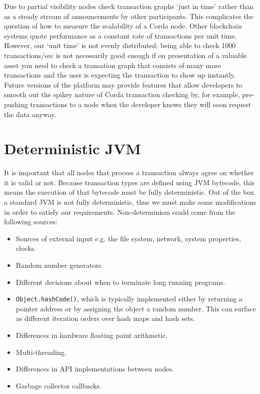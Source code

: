 \documentclass{article}
\begin{document}

Due to partial visibility nodes check transaction graphs `just in time' rather than as a steady stream of
announcements by other participants. This complicates the question of how to measure the scalability of a Corda
node. Other blockchain systems quote performance as a constant rate of transactions per unit time.
However, our `unit time' is not evenly distributed: being able to check 1000 transactions/sec is not
necessarily good enough if on presentation of a valuable asset you need to check a transation graph that consists
of many more transactions and the user is expecting the transaction to show up instantly. Future versions of
the platform may provide features that allow developers to smooth out the spikey nature of Corda transaction
checking by, for example, pre-pushing transactions to a node when the developer knows they will soon request
the data anyway.

\section{Deterministic JVM}

It is important that all nodes that process a transaction always agree on whether it is valid or not. Because
transaction types are defined using JVM bytecode, this means the execution of that bytecode must be fully
deterministic. Out of the box a standard JVM is not fully deterministic, thus we must make some modifications
in order to satisfy our requirements. Non-determinism could come from the following sources:

\begin{itemize}
\item Sources of external input e.g. the file system, network, system properties, clocks.
\item Random number generators.
\item Different decisions about when to terminate long running programs.
\item \texttt{Object.hashCode()}, which is typically implemented either by returning a pointer address or by
assigning the object a random number. This can surface as different iteration orders over hash maps and hash sets.
\item Differences in hardware floating point arithmetic.
\item Multi-threading.
\item Differences in API implementations between nodes.
\item Garbage collector callbacks.
\end{itemize}
\end{document}
